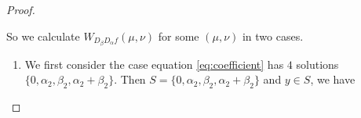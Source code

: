 \documentclass{article}
\newcommand{\0}{\textbf{0}}
\newcommand{\1}{\textbf{1}}
\newcommand{\TRACE}{\operatorname{Tr}_1^k}
\theoremstyle{plain}
\theoremstyle{nonumberplain}
\begin{document}
\begin{proof}
\begin{enumerate}[label=\textbf{Case \arabic*}]
    So we calculate $ W_{D_{\beta}D_{\alpha}f}(\mu,\nu) $ for some $ (\mu,\nu) $ in two cases.
    \begin{enumerate}[label=\textbf{Case \Alph{*}},itemindent=*,wide=\parindent]
        \item 
        We first consider the case equation \eqref{eq:coefficient} has $ 4 $ solutions 
        $ \{0,\alpha_2,\beta_2,\alpha_2+\beta_2\} $. 
        Then $ S=\{0,\alpha_2,\beta_2,\alpha_2+\beta_2\} $ and $ y\in S $, we have 

\end{enumerate}
\end{enumerate}
\end{proof}
\end{document}
